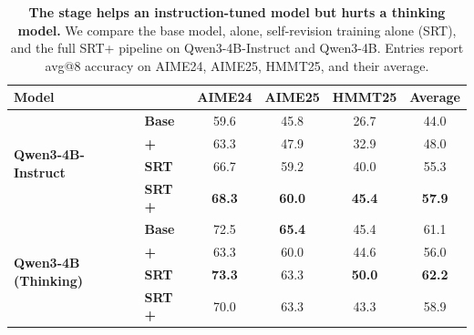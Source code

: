 \begin{table}[t]
\centering
\caption{\textbf{The \opsd{} stage helps an instruction-tuned model but hurts
a thinking model.}
We compare the base model, \opsd{} alone, self-revision training alone (SRT),
and the full SRT+\opsd{} pipeline on Qwen3-4B-Instruct and Qwen3-4B.
Entries report avg@8 accuracy on AIME24, AIME25, HMMT25, and their average.}
\label{tab:sd_zero_result}
\small
\setlength{\tabcolsep}{4pt}
\renewcommand{\arraystretch}{1.12}
\begin{tabular*}{\textwidth}{@{\extracolsep{\fill}}llcccc@{}}
\toprule
\textbf{Model}
&
& \textbf{AIME24}
& \textbf{AIME25}
& \textbf{HMMT25}
& \textbf{Average} \\
\midrule

\multirow{4}{*}{\textbf{Qwen3-4B-Instruct}}
& \textbf{Base}
& 59.6
& 45.8
& 26.7
& 44.0 \\

&
\textbf{+\opsd{}}
& 63.3
& 47.9
& 32.9
& 48.0 \\

&
\textbf{SRT}
& 66.7
& 59.2
& 40.0
& 55.3 \\

&
\textbf{SRT + \opsd{}}
& \textbf{68.3}
& \textbf{60.0}
& \textbf{45.4}
& \textbf{57.9} \\

\midrule

\multirow{4}{*}{\textbf{Qwen3-4B (Thinking)}}
& \textbf{Base}
& 72.5
& \textbf{65.4}
& 45.4
& 61.1 \\

&
\textbf{+\opsd{}}
& 63.3
& 60.0
& 44.6
& 56.0 \\

&
\textbf{SRT}
& \textbf{73.3}
& 63.3
& \textbf{50.0}
& \textbf{62.2} \\

&
\textbf{SRT + \opsd{}}
& 70.0
& 63.3
& 43.3
& 58.9 \\

\bottomrule
\end{tabular*}
\end{table}
